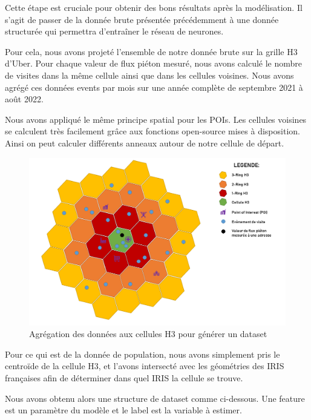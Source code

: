 Cette étape est cruciale pour obtenir des bons résultats après la modélisation. Il s'agit de passer de la donnée brute présentée précédemment à une donnée structurée qui permettra d'entraîner le réseau de neurones.

Pour cela, nous avons projeté l'ensemble de notre donnée brute sur la grille H3 d'Uber. Pour chaque valeur de flux piéton mesuré, nous avons calculé le nombre de visites dans la même cellule ainsi que dans les cellules voisines. Nous avons agrégé ces données events par mois sur une année complète de septembre 2021 à août 2022.

Nous avons appliqué le même principe spatial pour les POIs. Les cellules voisines se calculent très facilement grâce aux fonctions open-source mises à disposition. Ainsi on peut calculer différents anneaux autour de notre cellule de départ.


\begin{figure}[H]
    \centering
    \includegraphics[width=\linewidth]{images/graphs/dataset.png}
    \captionsetup{justification=centering}
    \caption{Agrégation des données aux cellules H3 pour générer un dataset}
    \label{fig:dataset_aggregation}
\end{figure}

Pour ce qui est de la donnée de population, nous avons simplement pris le centroïde de la cellule H3, et l'avons intersecté avec les géométries des IRIS françaises afin de déterminer dans quel IRIS la cellule se trouve.

Nous avons obtenu alors une structure de dataset comme ci-dessous. Une feature est un paramètre du modèle et le label est la variable à estimer.


